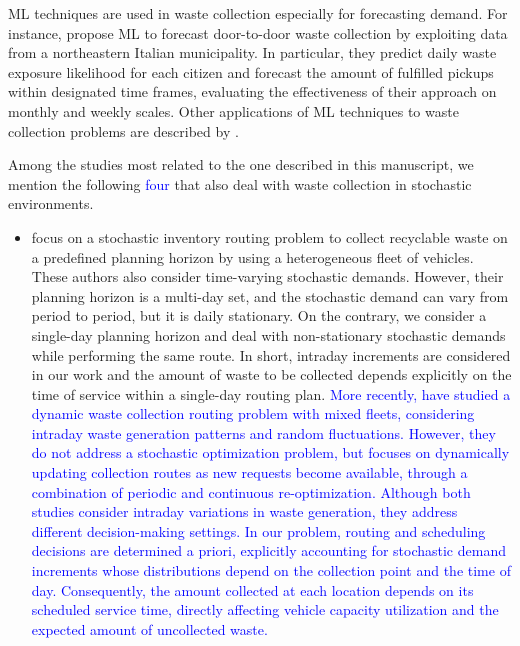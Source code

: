 \documentclass[authoryear,preprint,12pt]{elsarticle}
\newcommand{\rev}[1]{\textcolor{blue}{{#1}}}
\begin{document}
ML techniques are used in waste collection especially for forecasting demand. For instance, \cite{Pasa2025} propose ML to forecast door-to-door waste collection by exploiting data from a northeastern Italian municipality. In particular, they predict daily
waste exposure likelihood for each citizen and forecast the amount of fulfilled pickups within designated time frames, evaluating the
effectiveness of their approach on monthly and weekly scales. Other applications of ML techniques to waste collection problems are described by \cite{Xia2022}.



Among the studies most related to the one described in this manuscript, we mention the following \rev{four} that also deal with waste collection in stochastic environments.
\begin{itemize}
\item \cite{Markov2020} focus on a stochastic inventory routing problem to collect recyclable waste on a predefined planning horizon by using a heterogeneous fleet of vehicles. These authors also consider time-varying stochastic
demands. However, their planning horizon is a multi-day set, and the stochastic demand can vary from period to period, but it is daily stationary. On the contrary, we consider a single-day planning horizon and deal with non-stationary stochastic demands while performing the same route. In short, intraday increments are considered in our work and the amount of waste to be collected depends explicitly on the time of service within a single-day routing plan.
%
\rev{More recently, \cite{Huang2026} have studied a dynamic waste collection routing problem with mixed fleets, considering intraday waste generation patterns and random fluctuations. However, they do not address a stochastic optimization problem, but focuses on dynamically updating collection routes as new requests become available, through a combination of periodic and continuous re-optimization. Although both studies consider intraday variations in waste generation, they address different decision-making settings. In our problem, routing and scheduling decisions are determined a priori, explicitly accounting for stochastic demand increments whose distributions depend on the collection point and the time of day. Consequently, the amount collected at each location depends on its scheduled service time, directly affecting vehicle capacity utilization and the expected amount of uncollected waste.}



\end{itemize}
\end{document}
